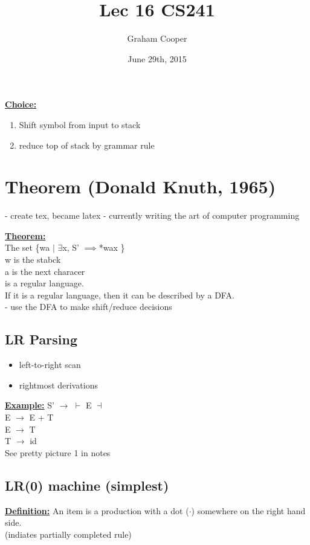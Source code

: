 \documentclass[12pt]{article}
\title{\vspace{-15ex}Lec 16 CS241\vspace{-1ex}}
\date{June 29th, 2015}
\author{Graham Cooper}
\newcommand{\myt}[1]{\textbf{\underline{#1}}}
\begin{document}
	\maketitle
	
	\myt{Choice:}\\
	\begin{enumerate}
		\item Shift symbol from input to stack
		\item reduce top of stack by grammar rule
	\end{enumerate}
	
	\section*{Theorem (Donald Knuth, 1965)}
	- create tex, became latex
	- currently writing the art of computer programming
	
	\myt{Theorem:}\\
	The set \{wa $|$ $\exists$x, S' $\implies$*wax \}\\
	w is the stabck\\
	a is the next characer\\
	is a regular language.\\
	
	If it is a regular language, then it can be described by a DFA.\\
	- use the DFA to make shift/reduce decisions\\
	
	\subsection*{LR Parsing}
	\begin{itemize}
		\item left-to-right scan
		\item rightmost derivations
	\end{itemize}
	
	\myt{Example:}
	S' $\rightarrow$ $\vdash$ E $\dashv$\\
	E $\rightarrow$ E + T\\
	E $\rightarrow$ T\\
	T $\rightarrow$ id\\
	See pretty picture 1 in notes\\
	
	\subsection*{LR(0) machine (simplest)}
	\myt{Definition:} An item is a production with a dot ($\cdot$) somewhere on the right hand side.\\
	(indiates partially completed rule)\\
	
\end{document}
